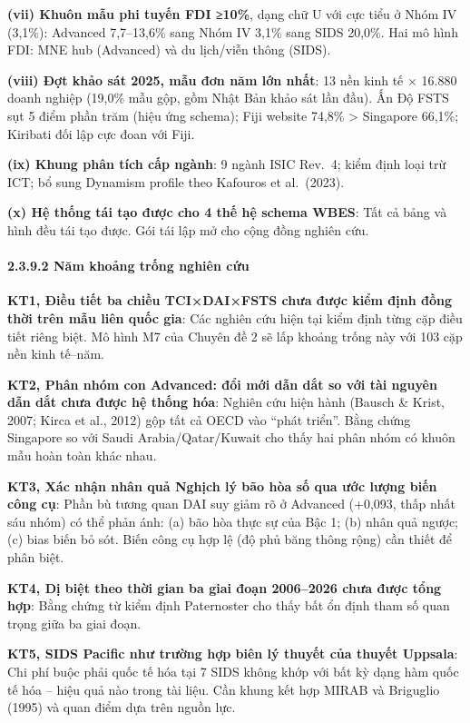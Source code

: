 \documentclass[
  a4paper,
  13pt]{extreport}
\begin{document}
\textbf{(vii) Khuôn mẫu phi tuyến FDI ≥10\%}, dạng chữ U với cực tiểu ở
Nhóm IV (3,1\%): Advanced 7,7--13,6\% sang Nhóm IV 3,1\% sang SIDS
20,0\%. Hai mô hình FDI: MNE hub (Advanced) và du lịch/viễn thông
(SIDS).

\textbf{(viii) Đợt khảo sát 2025, mẫu đơn năm lớn nhất}: 13 nền kinh tế
× 16.880 doanh nghiệp (19,0\% mẫu gộp, gồm Nhật Bản khảo sát lần đầu).
Ấn Độ FSTS sụt 5 điểm phần trăm (hiệu ứng schema); Fiji website 74,8\%
\textgreater{} Singapore 66,1\%; Kiribati đối lập cực đoan với Fiji.

\textbf{(ix) Khung phân tích cấp ngành}: 9 ngành ISIC Rev.~4; kiểm định
loại trừ ICT; bổ sung Dynamism profile theo Kafouros et al.~(2023).

\textbf{(x) Hệ thống tái tạo được cho 4 thế hệ schema WBES}: Tất cả bảng
và hình đều tái tạo được. Gói tái lập mở cho cộng đồng nghiên cứu.

\hypertarget{nux103m-khoux1ea3ng-trux1ed1ng-nghiuxean-cux1ee9u}{%
\paragraph{2.3.9.2 Năm khoảng trống nghiên
cứu}\label{nux103m-khoux1ea3ng-trux1ed1ng-nghiuxean-cux1ee9u}}

\textbf{KT1, Điều tiết ba chiều TCI×DAI×FSTS chưa được kiểm định đồng
thời trên mẫu liên quốc gia}: Các nghiên cứu hiện tại kiểm định từng cặp
điều tiết riêng biệt. Mô hình M7 của Chuyên đề 2 sẽ lấp khoảng trống này
với 103 cặp nền kinh tế--năm.

\textbf{KT2, Phân nhóm con Advanced: đổi mới dẫn dắt so với tài nguyên
dẫn dắt chưa được hệ thống hóa}: Nghiên cứu hiện hành (Bausch \& Krist,
2007; Kirca et al., 2012) gộp tất cả OECD vào ``phát triển''. Bằng chứng
Singapore so với Saudi Arabia/Qatar/Kuwait cho thấy hai phân nhóm có
khuôn mẫu hoàn toàn khác nhau.

\textbf{KT3, Xác nhận nhân quả Nghịch lý bão hòa số qua ước lượng biến
công cụ}: Phần bù tương quan DAI suy giảm rõ ở Advanced (+0,093, thấp
nhất sáu nhóm) có thể phản ánh: (a) bão hòa thực sự của Bậc 1; (b) nhân
quả ngược; (c) bias biến bỏ sót. Biến công cụ hợp lệ (độ phủ băng thông
rộng) cần thiết để phân biệt.

\textbf{KT4, Dị biệt theo thời gian ba giai đoạn 2006--2026 chưa được
tổng hợp}: Bằng chứng từ kiểm định Paternoster cho thấy bất ổn định tham
số quan trọng giữa ba giai đoạn.

\textbf{KT5, SIDS Pacific như trường hợp biên lý thuyết của thuyết
Uppsala}: Chi phí buộc phải quốc tế hóa tại 7 SIDS không khớp với bất kỳ
dạng hàm quốc tế hóa -- hiệu quả nào trong tài liệu. Cần khung kết hợp
MIRAB và Briguglio (1995) và quan điểm dựa trên nguồn lực.
\end{document}
